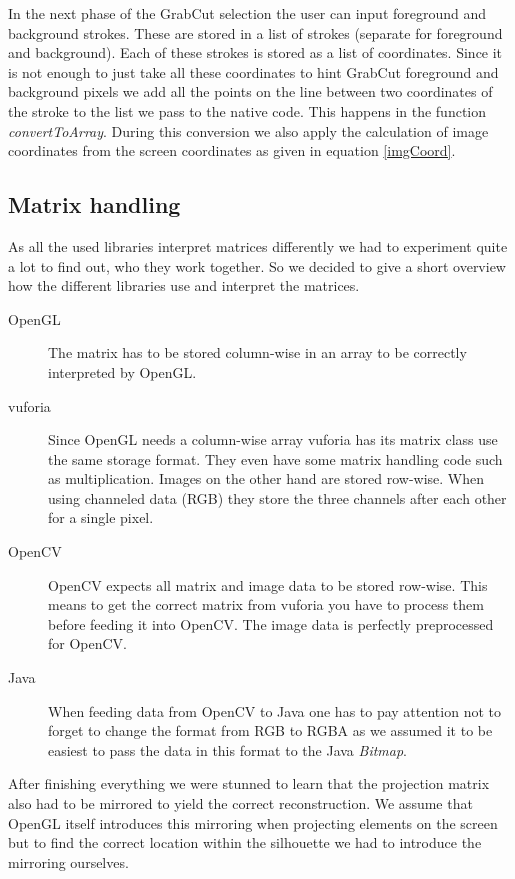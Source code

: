 \documentclass[10pt,twocolumn,letterpaper]{article}
\begin{document}
In the next phase of the GrabCut selection the user can input foreground and background strokes. These are stored in a list of strokes (separate for foreground and background). Each of these strokes is stored as a list of coordinates. Since it is not enough to just take all these coordinates to hint GrabCut foreground and background pixels we add all the points on the line between two coordinates of the stroke to the list we pass to the native code. This happens in the function \emph{convertToArray}. During this conversion we also apply the calculation of image coordinates from the screen coordinates as given in equation \ref{imgCoord}.

\subsection{Matrix handling}

As all the used libraries interpret matrices differently we had to experiment quite a lot to find out, who they work together. So we decided to give a short overview how the different libraries use and interpret the matrices.

\begin{description}
	\item[OpenGL] The matrix has to be stored column-wise in an array to be correctly interpreted by OpenGL.
	\item[vuforia] Since OpenGL needs a column-wise array vuforia has its matrix class use the same storage format. They even have some matrix handling code such as multiplication. Images on the other hand are stored row-wise. When using channeled data (RGB) they store the three channels after each other for a single pixel.
	\item[OpenCV] OpenCV expects all matrix and image data to be stored row-wise. This means to get the correct matrix from vuforia you have to process them before feeding it into OpenCV. The image data is perfectly preprocessed for OpenCV.
	\item[Java] When feeding data from OpenCV to Java one has to pay attention not to forget to change the format from RGB to RGBA as we assumed it to be easiest to pass the data in this format to the Java \emph{Bitmap}.
\end{description}

After finishing everything we were stunned to learn that the projection matrix also had to be mirrored to yield the correct reconstruction. We assume that OpenGL itself introduces this mirroring when projecting elements on the screen but to find the correct location within the silhouette we had to introduce the mirroring ourselves.
\end{document}
